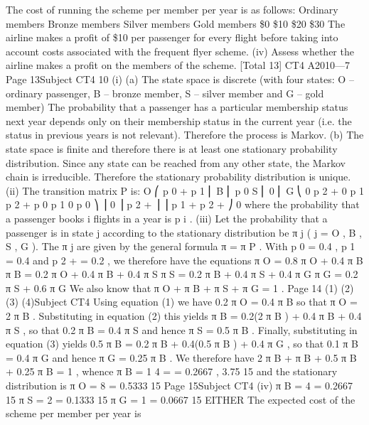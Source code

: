 The cost of running the scheme per member per year is as follows:
Ordinary members
Bronze members
Silver members
Gold members
\$0
\$10
\$20
\$30
The airline makes a profit of \$10 per passenger for every flight before taking into
account costs associated with the frequent flyer scheme.
(iv)
Assess whether the airline makes a profit on the members of the scheme. 
[Total 13]
CT4 A2010—7
Page 13Subject CT4 %
10
(i)
(a)
The state space is discrete (with four states: O – ordinary passenger,
B – bronze member, S – silver member and G – gold member)
The probability that a passenger has a particular membership
status next year depends only on their membership status in the
current year (i.e. the status in previous years is not relevant).
Therefore the process is Markov.
(b)
The state space is finite and therefore there is at least one stationary
probability distribution.
Since any state can be reached from any other state, the
Markov chain is irreducible.
Therefore the stationary probability distribution is unique.
(ii)
The transition matrix P is:
O ⎛ p 0 + p 1
⎜
B ⎜ p 0
S ⎜ 0
⎜
G ⎝ 0
p 2 + 0
p 1 p 2 +
p 0 p 1
0 p 0
⎞
⎟
0
⎟
p 2 + ⎟
⎟
p 1 + p 2 + ⎠
0
where the probability that a passenger books i flights in a year is p i .
(iii)
Let the probability that a passenger is in state j according to the stationary
distribution be π j ( j = O , B , S , G ).
The π j are given by the general formula
π = π P .
With p 0 = 0.4 , p 1 = 0.4 and p 2 + = 0.2 , we therefore have the equations
π O = 0.8 π O + 0.4 π B
π B = 0.2 π O + 0.4 π B + 0.4 π S
π S = 0.2 π B + 0.4 π S + 0.4 π G
π G = 0.2 π S + 0.6 π G
We also know that
π O + π B + π S + π G = 1 .
Page 14
(1)
(2)
(3)
(4)Subject CT4 %
Using equation (1) we have
0.2 π O = 0.4 π B
so that
π O = 2 π B .
Substituting in equation (2) this yields
π B = 0.2(2 π B ) + 0.4 π B + 0.4 π S ,
so that
0.2 π B = 0.4 π S
and hence
π S = 0.5 π B .
Finally, substituting in equation (3) yields
0.5 π B = 0.2 π B + 0.4(0.5 π B ) + 0.4 π G ,
so that
0.1 π B = 0.4 π G
and hence
π G = 0.25 π B .
We therefore have
2 π B + π B + 0.5 π B + 0.25 π B = 1 ,
whence
π B =
1
4
= = 0.2667 ,
3.75 15
and the stationary distribution is
π O =
8
= 0.5333
15
Page 15Subject CT4 %
(iv)
π B = 4
= 0.2667
15
π S = 2
= 0.1333
15
π G = 1
= 0.0667
15
EITHER
The expected cost of the scheme per member per year is
